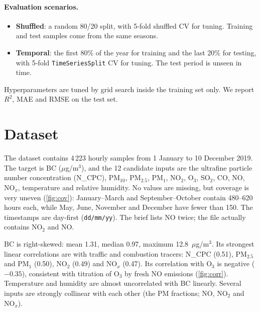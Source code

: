 \documentclass[11pt,a4paper]{article}
\newcommand{\ugm}{$\mu$g/m$^3$}
\begin{document}
\paragraph{Evaluation scenarios.}
\begin{itemize}
  \item \textbf{Shuffled}: a random 80/20 split, with 5-fold shuffled CV for tuning. Training and test samples come from the same seasons.
  \item \textbf{Temporal}: the first 80\% of the year for training and the last 20\% for testing, with 5-fold \texttt{TimeSeriesSplit} CV for tuning. The test period is unseen in time.
\end{itemize}
Hyperparameters are tuned by grid search inside the training set only. We report $R^2$, MAE and RMSE on the test set.

\section{Dataset}
The dataset contains 4\,223 hourly samples from 1 January to 10 December 2019. The target is BC (\ugm), and the 12 candidate inputs are the ultrafine particle number concentration (N\_CPC), PM$_{10}$, PM$_{2.5}$, PM$_1$, NO$_2$, O$_3$, SO$_2$, CO, NO, NO$_x$, temperature and relative humidity. No values are missing, but coverage is very uneven (\cref{fig:cov}): January--March and September--October contain 480--620 hours each, while May, June, November and December have fewer than 150. The timestamps are day-first (\texttt{dd/mm/yy}). The brief lists NO twice; the file actually contains NO$_2$ and NO.

BC is right-skewed: mean 1.31, median 0.97, maximum 12.8~\ugm. Its strongest linear correlations are with traffic and combustion tracers: N\_CPC (0.51), PM$_{2.5}$ and PM$_1$ (0.50), NO$_2$ (0.49) and NO$_x$ (0.47). Its correlation with O$_3$ is negative ($-0.35$), consistent with titration of O$_3$ by fresh NO emissions (\cref{fig:corr}). Temperature and humidity are almost uncorrelated with BC linearly. Several inputs are strongly collinear with each other (the PM fractions; NO, NO$_2$ and NO$_x$).
\end{document}
